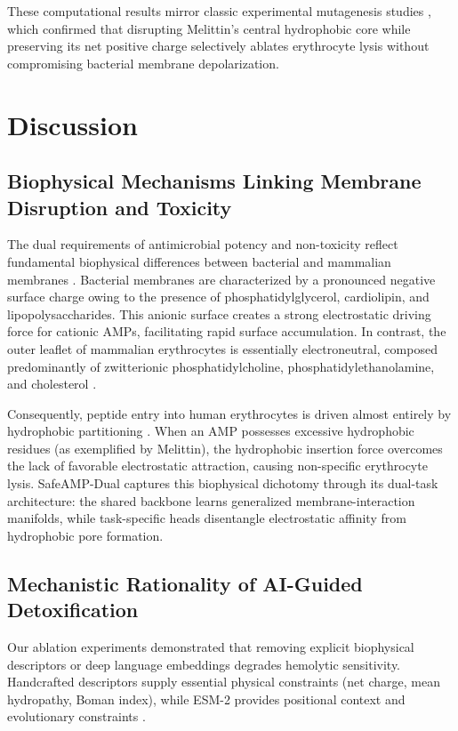\documentclass[11pt,a4paper]{article}
\begin{document}
These computational results mirror classic experimental mutagenesis studies \cite{blondelle1991hemolytic, oren1997selective}, which confirmed that disrupting Melittin's central hydrophobic core while preserving its net positive charge selectively ablates erythrocyte lysis without compromising bacterial membrane depolarization.

\newpage

\section{Discussion}

\subsection{Biophysical Mechanisms Linking Membrane Disruption and Toxicity}
The dual requirements of antimicrobial potency and non-toxicity reflect fundamental biophysical differences between bacterial and mammalian membranes \cite{zasloff2002antimicrobial, matsuzaki1999why}. Bacterial membranes are characterized by a pronounced negative surface charge owing to the presence of phosphatidylglycerol, cardiolipin, and lipopolysaccharides. This anionic surface creates a strong electrostatic driving force for cationic AMPs, facilitating rapid surface accumulation. In contrast, the outer leaflet of mammalian erythrocytes is essentially electroneutral, composed predominantly of zwitterionic phosphatidylcholine, phosphatidylethanolamine, and cholesterol \cite{hancock2006antimicrobial}.

Consequently, peptide entry into human erythrocytes is driven almost entirely by hydrophobic partitioning \cite{eisenberg1982helical}. When an AMP possesses excessive hydrophobic residues (as exemplified by Melittin), the hydrophobic insertion force overcomes the lack of favorable electrostatic attraction, causing non-specific erythrocyte lysis. SafeAMP-Dual captures this biophysical dichotomy through its dual-task architecture: the shared backbone learns generalized membrane-interaction manifolds, while task-specific heads disentangle electrostatic affinity from hydrophobic pore formation.

\subsection{Mechanistic Rationality of AI-Guided Detoxification}
Our ablation experiments demonstrated that removing explicit biophysical descriptors or deep language embeddings degrades hemolytic sensitivity. Handcrafted descriptors supply essential physical constraints (net charge, mean hydropathy, Boman index), while ESM-2 provides positional context and evolutionary constraints \cite{lin2023evolutionary}. 
\end{document}
